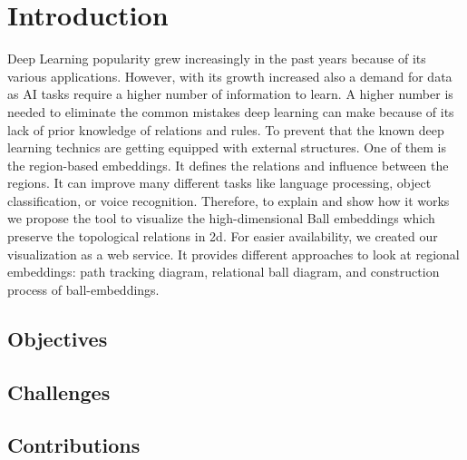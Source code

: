 \chapter{Introduction}
Deep Learning popularity grew increasingly in the past years because of its various applications. However, with its growth increased also a demand for data as AI tasks require a higher number of information to learn. A higher number is needed to eliminate the common mistakes deep learning can make because of its lack of prior knowledge of relations and rules. To prevent that the known deep learning technics are getting equipped with external structures. One of them is the region-based embeddings. It defines the relations and influence between the regions. It can improve many different tasks like language processing, object classification, or voice recognition. Therefore, to explain and show how it works we propose the tool to visualize the high-dimensional Ball embeddings which preserve the topological relations in 2d. For easier availability, we created our visualization as a web service. It provides different approaches to look at regional embeddings: path tracking diagram, relational ball diagram, and construction process of ball-embeddings.

\section{Objectives}
\section{Challenges}
\section{Contributions}